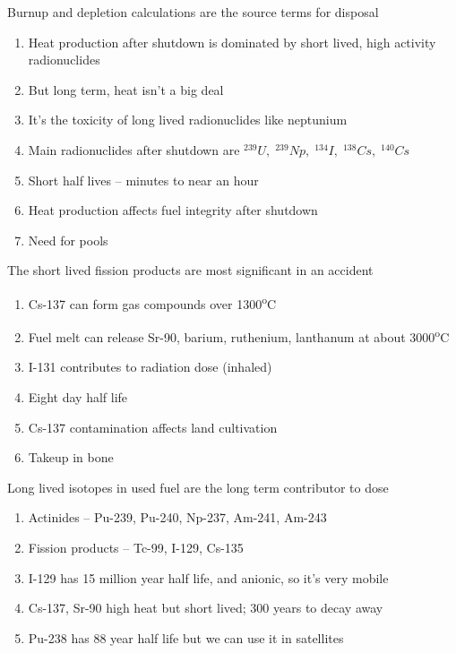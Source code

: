\documentclass[aspectratio=1610,pdftex,dvipsnames,compress,xcolor={dvipsnames}]{beamer}
\begin{document}
\begin{frame}{Burnup and depletion calculations are the source terms for disposal}
    \begin{enumerate}[series=outerlist,topsep=0pt,itemsep=15pt,leftmargin=*,label=(\arabic*)]
        \item[]Heat production after shutdown is dominated by short lived, high activity radionuclides
        \item[]But long term, heat isn't a big deal
        \item[]It's the toxicity of long lived radionuclides like neptunium
        \item[]Main radionuclides after shutdown are $^{239}U, \; ^{239}Np, \; ^{134}I, \; ^{138}Cs, \; ^{140}Cs$
        \item[]Short half lives -- minutes to near an hour
        \item[]Heat production affects fuel integrity after shutdown
        \item[]Need for pools
    \end{enumerate}
\end{frame}


\begin{frame}{The short lived fission products are most significant in an accident}
    \begin{enumerate}[series=outerlist,topsep=0pt,itemsep=15pt,leftmargin=*,label=(\arabic*)]
        \item[]Cs-137 can form gas compounds over 1300\textsuperscript{o}C
        \item[]Fuel melt can release Sr-90, barium, ruthenium, lanthanum at about 3000\textsuperscript{o}C
        \item[]I-131 contributes to radiation dose (inhaled)
        \item[]Eight day half life
        \item[]Cs-137 contamination affects land cultivation
        \item[]Takeup in bone
    \end{enumerate}
\end{frame}


\begin{frame}{Long lived isotopes in used fuel are the long term contributor to dose}
    \begin{enumerate}[series=outerlist,topsep=0pt,itemsep=21pt,leftmargin=*,label=(\arabic*)]
        \item[]Actinides -- Pu-239, Pu-240, Np-237, Am-241, Am-243
        \item[]Fission products -- Tc-99, I-129, Cs-135
        \item[]I-129 has 15 million year half life, and anionic, so it's very mobile
        \item[]Cs-137, Sr-90 high heat but short lived; 300 years to decay away
        \item[]Pu-238 has 88 year half life but we can use it in satellites 
    \end{enumerate}
\end{frame}
\end{document}
